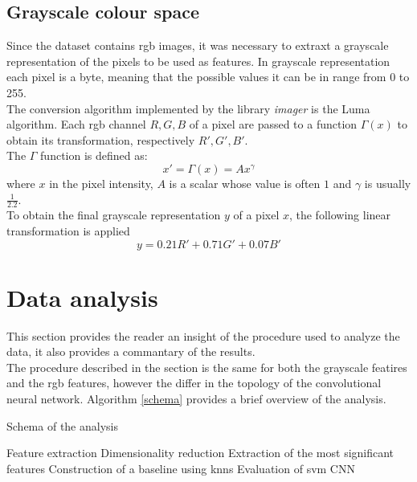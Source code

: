 \documentclass{article}
\begin{document}
\subsection{Grayscale colour space}
Since the dataset contains rgb images, it was necessary to extraxt a grayscale representation of the pixels to be used as features.
In grayscale representation each pixel is a byte, meaning that the possible values it can be in range from 0 to 255. \\
The conversion algorithm implemented by the library \textit{imager} is the Luma algorithm. Each rgb channel $R, G, B$ of a pixel are passed to a function $\Gamma(x)$ to obtain its transformation, respectively $R', G', B'$. \\
The $\Gamma$ function is defined as: 
\begin{equation}
 x' = \Gamma(x) = Ax^{\gamma}
\end{equation}
where $x$ in the pixel intensity, $A$ is a scalar whose value is often $1$ and $\gamma$ is usually $\frac{1}{2.2}$.\\
To obtain the final grayscale representation  $y$ of a pixel $x$, the following linear transformation is applied  \cite{grayscaleconversion}
\begin{equation}
 y = 0.21 R' + 0.71 G' + 0.07  B'
\end{equation}


\section{Data analysis}
This section provides the reader an insight of the procedure used to analyze the data, it also provides a commantary of the results.\\
The procedure described in the section is the same for both the grayscale featires and the rgb features, however the differ in the topology of the convolutional neural network. Algorithm \ref{schema} provides a brief overview of the analysis.

\begin{algorithm}[H] \label{schema}
   \caption{Schema of the analysis}
    \begin{algorithmic}[1]
    \State Feature extraction
    \State Dimensionality reduction
    \State Extraction of the most significant features
    \State Construction of a baseline using knns
    \State Evaluation of svm
    \State CNN
\end{algorithmic}
\end{algorithm}
\end{document}
